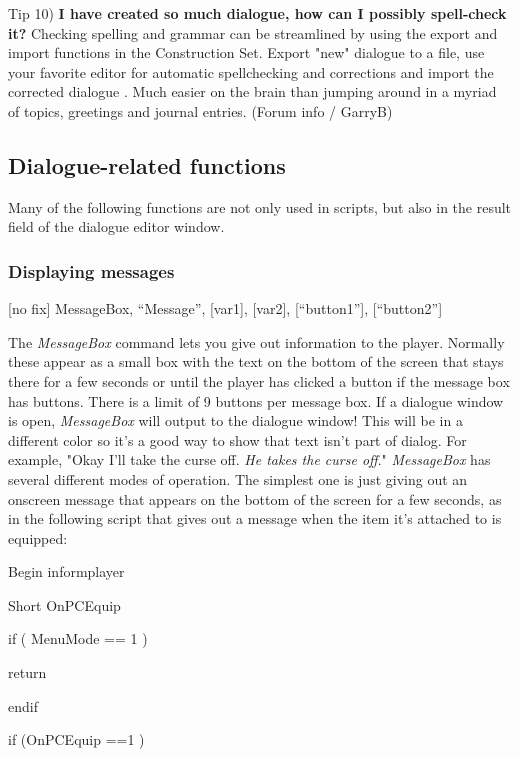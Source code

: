 \documentclass[
]{article}
\begin{document}
Tip 10) \textbf{I have created so much dialogue, how can I possibly
spell-check it?} Checking spelling and grammar can be streamlined by
using the export and import functions in the Construction Set. Export
"new" dialogue to a file, use your favorite editor for automatic
spellchecking and corrections and import the corrected dialogue . Much
easier on the brain than jumping around in a myriad of topics, greetings
and journal entries. (Forum info / GarryB)

\hypertarget{dialogue-related-functions}{%
\subsection{Dialogue-related
functions}\label{dialogue-related-functions}}

Many of the following functions are not only used in scripts, but also
in the result field of the dialogue editor window.

\hypertarget{displaying-messages}{%
\subsubsection{Displaying messages}\label{displaying-messages}}

{[}no fix{]} MessageBox, ``Message'', {[}var1{]}, {[}var2{]},
{[}``button1''{]}, {[}``button2''{]}

The \emph{MessageBox} command lets you give out information to the
player. Normally these appear as a small box with the text on the bottom
of the screen that stays there for a few seconds or until the player has
clicked a button if the message box has buttons. There is a limit of 9
buttons per message box. If a dialogue window is open, \emph{MessageBox}
will output to the dialogue window! This will be in a different color so
it's a good way to show that text isn't part of dialog. For example,
"Okay I'll take the curse off. \emph{He takes the curse off}."
\emph{MessageBox} has several different modes of operation. The simplest
one is just giving out an onscreen message that appears on the bottom of
the screen for a few seconds, as in the following script that gives out
a message when the item it's attached to is equipped:

Begin informplayer

Short OnPCEquip

if ( MenuMode == 1 )

return

endif

if (OnPCEquip ==1 )
\end{document}
